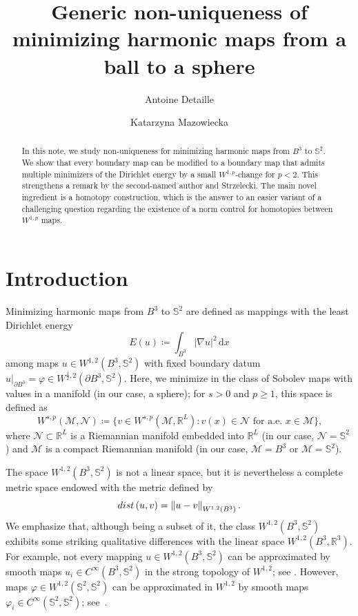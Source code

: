 \documentclass[12pt]{amsart}
\title[Non-uniqueness for minimizing harmonic maps]{Generic non-uniqueness of minimizing harmonic maps from a ball to a sphere}
\author{Antoine Detaille}
\author{Katarzyna Mazowiecka}
\newcommand{\m}{\mathcal{M}}
\def\n{{\mathcal N}}
\def\n{{\mathcal{M}}}
\def\n{{\mathcal N}}
\def\S{{\mathbb S}}
\def\dist{{\rm dist\,}}
\newcommand{\dif}{\,\mathrm{d}}
\newcommand{\dx}{\dif x}
\newcommand{\R}{\mathbb{R}}
\newcommand{\norm}[1]{\left\|{#1}\right\|}
\numberwithin{theorem}{section} \numberwithin{equation}{section}
\begin{document}
 \begin{abstract}
In this note, we study non-uniqueness for minimizing harmonic maps from $B^3$ to $\S^2$. We show that every boundary map can be modified to a boundary map that admits multiple minimizers of the Dirichlet energy by a small $W^{1,p}$-change for $p<2$.
This strengthens a remark by the second-named author and Strzelecki.
The main novel ingredient is a homotopy construction, which is the answer to an easier variant of a challenging question regarding the existence of a norm control for homotopies between \( W^{1,p} \) maps.

 \end{abstract}

\sloppy

\maketitle
\tableofcontents
\sloppy
\section{Introduction}
Minimizing harmonic maps from $B^3$ to $\S^2$ are defined as mappings with the least Dirichlet energy
\begin{equation}\label{eq:energy}
 E(u)\coloneqq \int_{B^3} |\nabla u|^2 \dx
\end{equation}
among maps $u\in W^{1,2}(B^3,\S^2)$ with fixed boundary datum $u\big\rvert_{\partial B^3} = \varphi\in W^{\frac 12,2}(\partial B^3,\S^2)$. 
Here, we minimize in the class of Sobolev maps with values in a manifold (in our case, a sphere); for $s>0$ and $p\ge1$, this space is defined as
\[
 W^{s,p}(\m,\n) \coloneqq \{ v\in W^{s,p}(\m,\R^L)\colon v(x) \in \n \text{ for a.e. } x\in \m\}\text{,}
\]
where $\n\subset \R^L$ is a Riemannian manifold embedded into $\R^L$ (in our case, $\n = \S^2$) and $\m$ is a compact Riemannian manifold (in our case, $\m = B^3$ or $\m = \S^2$).

The space \( W^{1,2}(B^3,\S^2) \) is not a linear space, but it is nevertheless a complete metric space endowed with the metric defined by
\[
	\dist{(u,v)} = \norm{u-v}_{W^{1,2}(B^{3})}\text{.}
\]
We emphasize that, although being a subset of it, the class \( W^{1,2}(B^3,\S^2) \) exhibits some striking qualitative differences with the linear space \(  W^{1,2}(B^3,\R^3) \).
For example, not every mapping $u \in W^{1,2}(B^3,\S^2)$ can be approximated by smooth maps $u_i\in C^\infty(B^3,\S^2)$ in the strong topology of $W^{1,2}$; see \cite[Section 4]{SU2}. However, maps $\varphi \in W^{1,2}(\S^2,\S^2)$ can be approximated in $W^{1,2}$ by smooth maps $\varphi_{i} \in C^\infty(\S^2,\S^2)$; see~\cite[Section 3]{SU1}.
\end{document}
